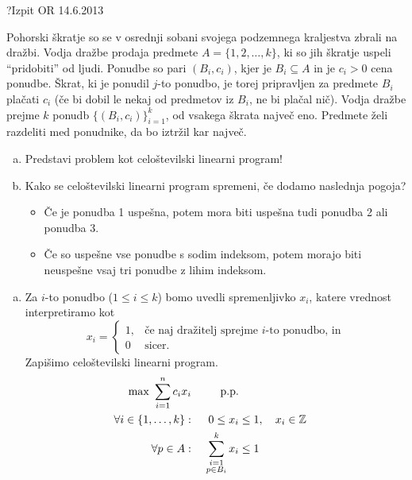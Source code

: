 \begin{naloga}{?}{Izpit OR 14.6.2013}
\begin{vprasanje}[drazba]
Pohorski škratje so se v osrednji sobani svojega podzemnega kraljestva
zbrali na dražbi.
Vodja dražbe prodaja predmete $A = \{1, 2, \dots, k\}$,
ki so jih škratje uspeli ``pridobiti'' od ljudi.
Ponudbe so pari $(B_i, c_i)$,
kjer je $B_i \subseteq A$ in je $c_i > 0$ cena ponudbe.
Škrat, ki je ponudil $j$-to ponudbo,
je torej pripravljen za predmete $B_i$ plačati $c_i$
(če bi dobil le nekaj od predmetov iz $B_i$, ne bi plačal nič).
Vodja dražbe prejme $k$ ponudb $\{(B_i, c_i)\}_{i=1}^k$,
od vsakega škrata največ eno.
Predmete želi razdeliti med ponudnike, da bo iztržil kar največ.

\begin{enumerate}[(a)]
\item Predstavi problem kot celoštevilski linearni program!

\item Kako se celoštevilski linearni program spremeni,
če dodamo naslednja pogoja?
    \begin{itemize}
    \item Če je ponudba 1 uspešna,
    potem mora biti uspešna tudi ponudba 2 ali ponudba 3.
    \item Če so uspešne vse ponudbe s sodim indeksom,
    potem morajo biti ne\-uspeš\-ne vsaj tri ponudbe z lihim indeksom.
    \end{itemize}
\end{enumerate}
\end{vprasanje}

\begin{odgovor}
\begin{enumerate}[(a)]
\item Za $i$-to ponudbo ($1 \le i \le k$) bomo uvedli spremenljivko $x_i$,
katere vrednost interpretiramo kot
$$
x_i = \begin{cases}
1, & \text{če naj dražitelj sprejme $i$-to ponudbo, in} \\
0  & \text{sicer.}
\end{cases}
$$
Zapišimo celoštevilski linearni program.
\begin{alignat*}{2}
\max \ \sum_{i=1}^n c_i x_i && \text{p.p.} \\
\forall i \in \{1, \dots, k\}: &\ & 0 \le x_i &\le 1, \quad x_i \in \mathbb{Z} \\
\forall p \in A: &\ & \sum_{\substack{i=1 \\ p \in B_i}}^k x_i &\le 1
\end{alignat*}


\end{enumerate}
\end{odgovor}
\end{naloga}
